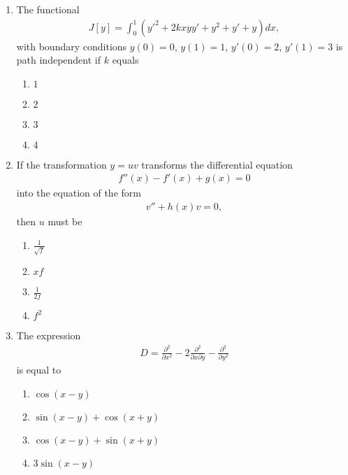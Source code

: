 \documentclass[journal]{IEEEtran}
\numberwithin{equation}{enumi}
\numberwithin{figure}{enumi}
\begin{document}
\begin{enumerate}
\item
The functional
\begin{align}
J[y] = \int_0^1 \left(y'^2 + 2kxyy' + y^2 + y' + y\right) dx,
\end{align}
with boundary conditions $y(0) = 0$, $y(1) = 1$, $y'(0) = 2$, $y'(1) = 3$ is path independent if $k$ equals
\hfill{}
\begin{multicols}{4}
\begin{enumerate}
  \item $1$
  \item $2$
  \item $3$
  \item $4$
\end{enumerate}
\end{multicols}

\item
If the transformation $y = uv$ transforms the differential equation
\begin{align}
f''(x) - f'(x) + g(x) = 0
\end{align}
into the equation of the form 
\begin{align}
v'' + h(x) v = 0,
\end{align}
then $u$ must be
\hfill{}
\begin{multicols}{4}
\begin{enumerate}
  \item $\frac{1}{\sqrt{f}}$
  \item $x f$
  \item $\frac{1}{2 f}$
  \item $f^2$
\end{enumerate}
\end{multicols}

\item
The expression
\begin{align}
D = \frac{\partial^2}{\partial x^2} - 2\frac{\partial^2}{\partial x \partial y} - \frac{\partial^2}{\partial y^2}
\end{align}
is equal to
\hfill{}
\begin{multicols}{2}
\begin{enumerate}
  \item $\cos(x - y)$
  \item $\sin(x - y) + \cos(x + y)$
  \item $\cos(x - y) + \sin(x + y)$
  \item $3 \sin(x - y)$
\end{enumerate}
\end{multicols}


\end{enumerate}
\end{document}
